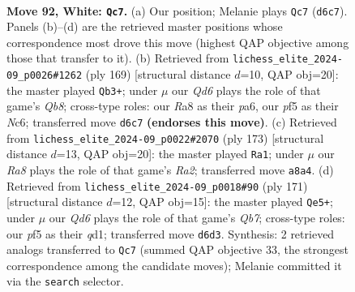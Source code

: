 \documentclass[11pt]{article}
\begin{document}
\clearpage

\begin{figure}[p]\centering
\begin{subfigure}{0.46\textwidth}\centering
\resizebox{\linewidth}{!}{%
\newchessgame
\chessboard[
  setfen={R7/8/3Q2p1/5p2/5P2/1k6/6K1/8 w - - 3 92},
  showmover=false,
  pgfstyle=straightmove, color=movearrow, markmove={d6-c7}
]}
\caption{}
\end{subfigure}\hfill
\begin{subfigure}{0.46\textwidth}\centering
\resizebox{\linewidth}{!}{%
\newchessgame
\chessboard[
  setfen={8/5k2/P1n1p3/8/4P3/4K3/8/1q6 b - - 1 85},
  showmover=false,
  pgfstyle=straightmove, color=movearrow, markmove={b1-b3}
]}
\caption{}
\end{subfigure}
\\[4pt]
\begin{subfigure}{0.46\textwidth}\centering
\resizebox{\linewidth}{!}{%
\newchessgame
\chessboard[
  setfen={8/r7/8/2p5/2P5/2P1k3/1K6/5q2 b - - 1 87},
  showmover=false,
  pgfstyle=straightmove, color=movearrow, markmove={a7-a1}
]}
\caption{}
\end{subfigure}\hfill
\begin{subfigure}{0.46\textwidth}\centering
\resizebox{\linewidth}{!}{%
\newchessgame
\chessboard[
  setfen={8/1k3p2/5P2/8/8/4K3/1q6/3Q4 b - - 6 86},
  showmover=false,
  pgfstyle=straightmove, color=movearrow, markmove={b2-e5}
]}
\caption{}
\end{subfigure}
\caption{\textbf{Move 92, White: \texttt{Qc7}.} (a) Our position; Melanie plays \texttt{Qc7} (\texttt{d6c7}). Panels (b)--(d) are the retrieved master positions whose correspondence most drove this move (highest QAP objective among those that transfer to it). (b) Retrieved from \texttt{lichess\_elite\_2024-09\_p0026\#1262} (ply 169) [structural distance $d$=10, QAP obj=20]: the master played \texttt{Qb3+}; under $\mu$ our \emph{Qd6} plays the role of that game's \emph{Qb8}; cross-type roles: our \emph{R}a8 as their \emph{p}a6, our \emph{p}f5 as their \emph{N}c6; transferred move \texttt{d6c7} \textbf{(endorses this move)}. (c) Retrieved from \texttt{lichess\_elite\_2024-09\_p0022\#2070} (ply 173) [structural distance $d$=13, QAP obj=20]: the master played \texttt{Ra1}; under $\mu$ our \emph{Ra8} plays the role of that game's \emph{Ra2}; transferred move \texttt{a8a4}. (d) Retrieved from \texttt{lichess\_elite\_2024-09\_p0018\#90} (ply 171) [structural distance $d$=12, QAP obj=15]: the master played \texttt{Qe5+}; under $\mu$ our \emph{Qd6} plays the role of that game's \emph{Qb7}; cross-type roles: our \emph{p}f5 as their \emph{q}d1; transferred move \texttt{d6d3}. Synthesis: 2 retrieved analogs transferred to \texttt{Qc7} (summed QAP objective 33, the strongest correspondence among the candidate moves); Melanie committed it via the \texttt{search} selector.}
\label{fig:thought-m182}
\end{figure}
\end{document}
